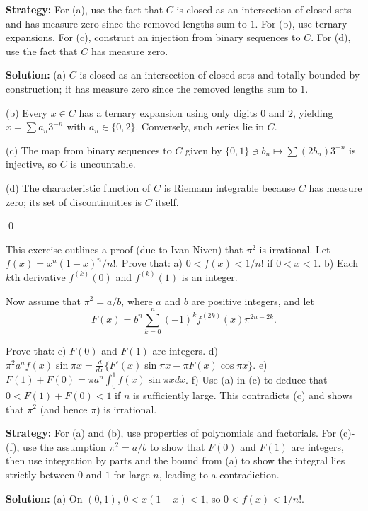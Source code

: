 \noindent\textbf{Strategy:} For (a), use the fact that $C$ is closed as an intersection of closed sets and has measure zero since the removed lengths sum to $1$. For (b), use ternary expansions. For (c), construct an injection from binary sequences to $C$. For (d), use the fact that $C$ has measure zero.

\bigskip\noindent\textbf{Solution:}
(a) $C$ is closed as an intersection of closed sets and totally bounded by construction; it has measure zero since the removed lengths sum to $1$.

(b) Every $x\in C$ has a ternary expansion using only digits $0$ and $2$, yielding $x=\sum a_n 3^{-n}$ with $a_n\in\{0,2\}$. Conversely, such series lie in $C$.

(c) The map from binary sequences to $C$ given by $\{0,1\}\ni b_n\mapsto \sum (2b_n)3^{-n}$ is injective, so $C$ is uncountable.

(d) The characteristic function of $C$ is Riemann integrable because $C$ has measure zero; its set of discontinuities is $C$ itself.




\qed
\begin{problembox}[7.33: Irrationality of $\pi^2$]
This exercise outlines a proof (due to Ivan Niven) that $\pi^2$ is irrational. Let $f(x) = x^n(1 - x)^n/n!$. Prove that:
a) $0 < f(x) < 1/n!$ if $0 < x < 1$.
b) Each $k$th derivative $f^{(k)}(0)$ and $f^{(k)}(1)$ is an integer.

Now assume that $\pi^2 = a/b$, where $a$ and $b$ are positive integers, and let
\[F(x) = b^n \sum_{k=0}^{n} (-1)^k f^{(2k)}(x) \pi^{2n-2k}.\]

Prove that:
c) $F(0)$ and $F(1)$ are integers.
d) $\pi^2 a^n f(x) \sin \pi x = \frac{d}{dx} \{ F'(x) \sin \pi x - \pi F(x) \cos \pi x \}$.
e) $F(1) + F(0) = \pi a^n \int_{0}^{1} f(x) \sin \pi x dx$.
f) Use (a) in (e) to deduce that $0 < F(1) + F(0) < 1$ if $n$ is sufficiently large. This contradicts (c) and shows that $\pi^2$ (and hence $\pi$) is irrational.
\end{problembox}

\noindent\textbf{Strategy:} For (a) and (b), use properties of polynomials and factorials. For (c)-(f), use the assumption $\pi^2 = a/b$ to show that $F(0)$ and $F(1)$ are integers, then use integration by parts and the bound from (a) to show the integral lies strictly between $0$ and $1$ for large $n$, leading to a contradiction.

\bigskip\noindent\textbf{Solution:}
(a) On $(0,1)$, $0<x(1-x)<1$, so $0<f(x)<1/n!$.

